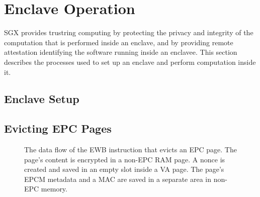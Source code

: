 \section{Enclave Operation}

SGX provides trustring computing by protecting the privacy and integrity of the
computation that is performed inside an enclave, and by providing remote
attestation identifying the software running inside an enclavee. This section
describes the processes used to set up an enclave and perform computation
inside it.

\subsection{Enclave Setup}



\subsection{Evicting EPC Pages}
\label{sec:sgx_ewb}



\begin{figure}[hbt!]
  \caption{
    The data flow of the EWB instruction that evicts an EPC page. The page's
    content is encrypted in a non-EPC RAM page. A nonce is created and saved
    in an empty slot inside a VA page. The page's EPCM metadata and a MAC
    are saved in a separate area in non-EPC memory.
  }
  \label{fig:sgx_ewb}
\end{figure}



